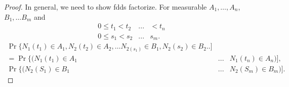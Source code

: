 \documentclass[a4paper,10pt]{article}
\theoremstyle{plain}
\theoremstyle{definition}
\begin{document}
\begin{proof}
In general, we need to show fdds factorize. For measurable $A_1, \hdots, A_n$, $B_1, \hdots B_m$ and \\
\begin{eqnarray*}
   0 \leq t_{1}< t_{2}&...&<t_{n}  \\
   0\leq s_{1}<s_{2}&...&s_{m}.
   \end{eqnarray*}
   \begin{eqnarray*}
   \Pr\{N_{1}(t_{1})\in A_{1}, N _{2}(t_{2})\in A_{2},\hdots N_{2(s_{1})}\in B_{1}, N_{2}(s_{2})\in B_{2} ..] \\
   =\Pr\{(N_{1}(t_{1})\in A_{1}&...&N_{1}(t_{n})\in A_{n})],\\
   \Pr\{(N_{2}(S_{1})\in B_{1}&...&N_{2}(S_{m})\in B_{m})].
\end{eqnarray*}
\end{proof}
\end{document}
